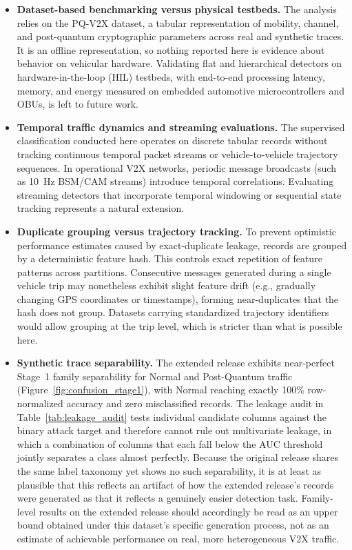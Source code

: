 \documentclass{IEEEoj}
\begin{document}
\begin{itemize}
    \item \textbf{Dataset-based benchmarking versus physical testbeds.} The analysis relies on the PQ-V2X dataset, a tabular representation of mobility, channel, and post-quantum cryptographic parameters across real and synthetic traces. It is an offline representation, so nothing reported here is evidence about behavior on vehicular hardware. Validating flat and hierarchical detectors on hardware-in-the-loop (HIL) testbeds, with end-to-end processing latency, memory, and energy measured on embedded automotive microcontrollers and OBUs, is left to future work.
    \item \textbf{Temporal traffic dynamics and streaming evaluations.} The supervised classification conducted here operates on discrete tabular records without tracking continuous temporal packet streams or vehicle-to-vehicle trajectory sequences. In operational V2X networks, periodic message broadcasts (such as 10~Hz BSM/CAM streams) introduce temporal correlations. Evaluating streaming detectors that incorporate temporal windowing or sequential state tracking represents a natural extension.
    \item \textbf{Duplicate grouping versus trajectory tracking.} To prevent optimistic performance estimates caused by exact-duplicate leakage, records are grouped by a deterministic feature hash. This controls exact repetition of feature patterns across partitions. Consecutive messages generated during a single vehicle trip may nonetheless exhibit slight feature drift (e.g., gradually changing GPS coordinates or timestamps), forming near-duplicates that the hash does not group. Datasets carrying standardized trajectory identifiers would allow grouping at the trip level, which is stricter than what is possible here.
    \item \textbf{Synthetic trace separability.} The extended release exhibits near-perfect Stage~1 family separability for Normal and Post-Quantum traffic (Figure~\ref{fig:confusion_stage1}), with Normal reaching exactly 100\% row-normalized accuracy and zero misclassified records. The leakage audit in Table~\ref{tab:leakage_audit} tests individual candidate columns against the binary attack target and therefore cannot rule out multivariate leakage, in which a combination of columns that each fall below the AUC threshold jointly separates a class almost perfectly. Because the original release shares the same label taxonomy yet shows no such separability, it is at least as plausible that this reflects an artifact of how the extended release's records were generated as that it reflects a genuinely easier detection task. Family-level results on the extended release should accordingly be read as an upper bound obtained under this dataset's specific generation process, not as an estimate of achievable performance on real, more heterogeneous V2X traffic.

\end{itemize}
\end{document}
